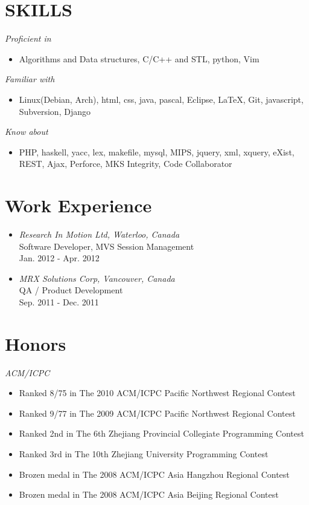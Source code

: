 \documentclass[line,margin]{res}
\begin{document}
\address{909-16 Cedarwoods Cres. Kitchener, ON, Canada  N2C 2L4}
\address{+1-519-404-7619 (Present - End of April 2012) or +1-778-862-3661 \\zmin@sfu.ca}
\begin{resume}
\section{SKILLS} 
	{\sl Proficient in } 
						\begin{itemize}
						\item Algorithms and Data structures, C/C++ and STL, python, Vim
						\end{itemize}
    {\sl Familiar with }
						\begin{itemize}
						\item Linux(Debian, Arch), html, css, java, pascal, Eclipse, \LaTeX, Git, javascript, Subversion, Django
						\end{itemize}
 	{\sl Know about } 
					\begin{itemize}
					\item PHP, haskell, yacc, lex, makefile, mysql, MIPS, jquery, xml, xquery, eXist, REST, Ajax, Perforce, MKS Integrity, Code Collaborator
					\end{itemize}

\section{Work Experience}
\begin{itemize}
\item {\sl Research In Motion Ltd, Waterloo, Canada}\\
 Software Developer, MVS Session Management \\
Jan. 2012 - Apr. 2012
\item {\sl MRX Solutions Corp, Vancouver, Canada}\\
 QA / Product Development \\
Sep. 2011 - Dec. 2011
\end{itemize}


\section{Honors}
{\sl ACM/ICPC}
\begin{itemize}
\item Ranked 8/75 in The 2010 ACM/ICPC Pacific Northwest Regional Contest	
\item Ranked 9/77 in The 2009 ACM/ICPC Pacific Northwest Regional Contest	
\item Ranked 2nd in The 6th Zhejiang Provincial Collegiate Programming Contest 
\item Ranked 3rd in The 10th Zhejiang University Programming Contest 
\item Brozen medal in The 2008 ACM/ICPC Asia Hangzhou Regional Contest 
\item Brozen medal in The 2008 ACM/ICPC Asia Beijing Regional Contest   


\end{itemize}
\end{resume}
\end{document}
